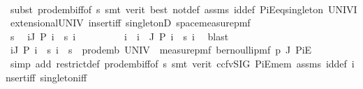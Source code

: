 \begin{isabellebody}
\ \ \ \ \ \ \ \ \isamarkupfalse%
\ {\isacharparenleft}{\kern0pt}subst\ prod{\isacharunderscore}{\kern0pt}emb{\isacharunderscore}{\kern0pt}iff{\isacharbrackleft}{\kern0pt}of\ s{\isacharbrackright}{\kern0pt}{\isacharparenright}{\kern0pt}\ {\isacharparenleft}{\kern0pt}smt\ {\isacharparenleft}{\kern0pt}verit{\isacharcomma}{\kern0pt}\ best{\isacharparenright}{\kern0pt}\ not{\isacharunderscore}{\kern0pt}def\ assms{\isacharparenleft}{\kern0pt}{}{\isacharparenright}{\kern0pt}\ id{\isacharunderscore}{\kern0pt}def\ PiE{\isacharunderscore}{\kern0pt}eq{\isacharunderscore}{\kern0pt}singleton\ UNIV{\isacharunderscore}{\kern0pt}I\ extensional{\isacharunderscore}{\kern0pt}UNIV\ insert{\isacharunderscore}{\kern0pt}iff\ singletonD\ space{\isacharunderscore}{\kern0pt}measure{\isacharunderscore}{\kern0pt}pmf{\isacharparenright}{\kern0pt}\isanewline
\ \ \ \ \isacommand{{\isacharbraceright}{\kern0pt}}\isamarkupfalse%
\isanewline
\ \ \ \ \isamarkupfalse%
\isanewline
\ \ \ \ \isacommand{{\isacharbraceleft}{\kern0pt}}\isamarkupfalse%
\isanewline
\ \ \ \ \ \ \isamarkupfalse%
\ s\ \isamarkupfalse%
\ {\isachardoublequoteopen}{\isasymnot}{\isacharparenleft}{\kern0pt}{\isasymforall}i{\isasymin}J{\isachardot}{\kern0pt}\ P\ i\ {\isacharequal}{\kern0pt}\ s\ i{\isacharparenright}{\kern0pt}{\isachardoublequoteclose}\isanewline
\ \ \ \ \ \ \isamarkupfalse%
\ \isamarkupfalse%
\ i\ \ {\isachardoublequoteopen}i\ {\isasymin}\ J{\isachardoublequoteclose}\ {\isachardoublequoteopen}P\ i\ {\isasymnoteq}\ s\ i{\isachardoublequoteclose}\ \isamarkupfalse%
\ blast\isanewline
\ \ \ \ \ \ \isamarkupfalse%
\ {\isachardoublequoteopen}{\isacharparenleft}{\kern0pt}{\isasymforall}i{\isasymin}J{\isachardot}{\kern0pt}\ P\ i\ {\isacharequal}{\kern0pt}\ s\ i{\isacharparenright}{\kern0pt}\ {\isacharequal}{\kern0pt}\ {\isacharparenleft}{\kern0pt}s\ {\isasymin}\ prod{\isacharunderscore}{\kern0pt}emb\ UNIV\ {\isacharparenleft}{\kern0pt}{\isasymlambda}{\isacharunderscore}{\kern0pt}{\isachardot}{\kern0pt}\ measure{\isacharunderscore}{\kern0pt}pmf\ {\isacharparenleft}{\kern0pt}bernoulli{\isacharunderscore}{\kern0pt}pmf\ p{\isacharparenright}{\kern0pt}{\isacharparenright}{\kern0pt}\ J\ {\isacharquery}{\kern0pt}PiE{\isacharparenright}{\kern0pt}{\isachardoublequoteclose}\isanewline
\ \ \ \ \ \ \ \ \isamarkupfalse%
\ {\isacharparenleft}{\kern0pt}simp\ add{\isacharcolon}{\kern0pt}\ restrict{\isacharunderscore}{\kern0pt}def\ prod{\isacharunderscore}{\kern0pt}emb{\isacharunderscore}{\kern0pt}iff{\isacharbrackleft}{\kern0pt}of\ s{\isacharbrackright}{\kern0pt}{\isacharparenright}{\kern0pt}\ {\isacharparenleft}{\kern0pt}smt\ {\isacharparenleft}{\kern0pt}verit{\isacharcomma}{\kern0pt}\ ccfv{\isacharunderscore}{\kern0pt}SIG{\isacharparenright}{\kern0pt}\ PiE{\isacharunderscore}{\kern0pt}mem\ assms{\isacharparenleft}{\kern0pt}{}{\isacharparenright}{\kern0pt}\ id{\isacharunderscore}{\kern0pt}def\ insert{\isacharunderscore}{\kern0pt}iff\ singleton{\isacharunderscore}{\kern0pt}iff{\isacharparenright}{\kern0pt}\isanewline

\end{isabellebody}
